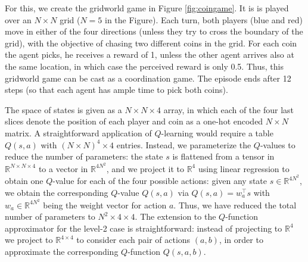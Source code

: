 For this, we create the gridworld game in Figure \ref{fig:coingame}. It is 
is played over an $N \times N$ grid ($N=5$ in the Figure). Each turn, both players (blue and red) move in either of the four directions (unless they try to cross the boundary of the grid), with the objective of chasing two different coins in the grid. For each coin the agent picks, he receives a reward of 1, unless the other agent arrives also at the same location,
in which case the perceived reward is only 0.5. 
Thus, this gridworld game can be cast as a coordination game.
The episode ends after 12 steps (so that each agent has ample time to pick both coins). 

The space of states is given as a $N \times N \times 4$ array, in which each of the four last slices denote the position of each player and coin as a one-hot encoded $N \times N$ matrix. A straightforward application of $Q$-learning would require a table $Q(s, a)$ with $(N \times N)^4 \times 4$ entries. Instead, we parameterize the $Q$-values to reduce the number of parameters: the state $s$ is flattened from a tensor in $\mathbb{R}
^{N \times N \times 4}$ to a vector in $\mathbb{R}
^{4N^2}$, and we project it to $\mathbb{R}^4$ using linear regression to obtain one $Q$-value for each of the four possible actions: 
given any state $s \in \mathbb{R}^{4N^2}$, we obtain the corresponding $Q$-value $Q(s, a)$ via $Q(s, a) = w_a^{\intercal}s $ with $w_a \in \mathbb{R}^{4N^2}$ being the weight vector for action $a$. Thus, we have reduced the total number of parameters to $N
^2\times 4 \times 4$. The extension to the $Q$-function approximator for the level-2 case is straightforward: instead of projecting to $\mathbb{R}^4$ we project to $\mathbb{R}^{4\times 4}$ to consider each pair of actions $(a, b)$, in order to approximate the corresponding $Q$-function $Q(s,a,b)$. 

